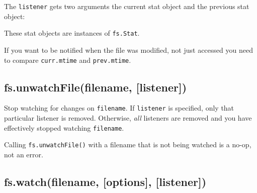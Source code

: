 The \texttt{listener} gets two arguments the current stat object and the
previous stat object:

\begin{Shaded}
\begin{Highlighting}[]
\NormalTok{(}\NormalTok{, } 
  \NormalTok{(} \NormalTok{+ }\NormalTok{);}
  \NormalTok{(} \NormalTok{+ }\NormalTok{);}
\NormalTok{\});}
\end{Highlighting}
\end{Shaded}

These stat objects are instances of \texttt{fs.Stat}.

If you want to be notified when the file was modified, not just accessed
you need to compare \texttt{curr.mtime} and \texttt{prev.mtime}.

\subsection{fs.unwatchFile(filename,
{[}listener{]})}\label{fs.unwatchfilefilename-listener}

\begin{Shaded}
\begin{Highlighting}[]
 \NormalTok{- }  \NormalTok{, } 
\end{Highlighting}
\end{Shaded}

Stop watching for changes on \texttt{filename}. If \texttt{listener} is
specified, only that particular listener is removed. Otherwise,
\emph{all} listeners are removed and you have effectively stopped
watching \texttt{filename}.

Calling \texttt{fs.unwatchFile()} with a filename that is not being
watched is a no-op, not an error.

\subsection{fs.watch(filename, {[}options{]},
{[}listener{]})}\label{fs.watchfilename-options-listener}

